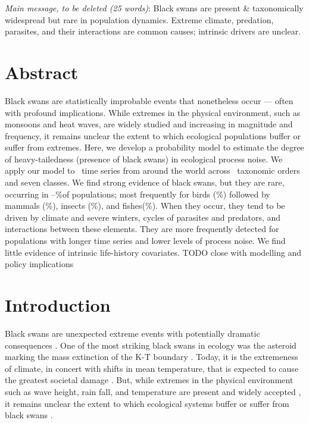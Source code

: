 
\noindent
\emph{Main message, to be deleted (25 words)}: Black swans are present \&
taxonomically widespread but rare in population dynamics. Extreme climate,
predation, parasites, and their interactions are common causes; intrinsic
drivers are unclear.

\section{Abstract}

Black swans are statistically improbable events that nonetheless occur ---
often with profound implications. While extremes in the physical
environment, such as monsoons and heat waves, are widely studied and increasing
in magnitude and frequency, it remains unclear the extent to which ecological
populations buffer or suffer from extremes. Here, we develop a probability
model to estimate the degree of heavy-tailedness (presence of black swans) in
ecological process noise. We apply our model to \NPops~time series from around
the world across \NOrders~taxonomic orders and seven classes. We find strong
evidence of black swans, but they are rare, occurring in
\overallMinPerc--\overallMaxPerc\%of populations; most frequently for birds
(\AvesRangePerc\%) followed by mammals (\MammaliaRangePerc\%), insects
(\InsectaRangePerc\%), and fishes(\OsteichthyesRangePerc\%). When they occur,
they tend to be driven by climate and severe winters, cycles of parasites and
predators, and interactions between these elements. They are more frequently
detected for populations with longer time series and lower levels of process
noise. We find little evidence of intrinsic life-history covariates. TODO close
with modelling and policy implications

\section{Introduction}

Black swans are unexpected extreme events with potentially dramatic
consequences \citep{taleb2007,sornette2009}. One of the most striking black
swans in ecology was the asteroid marking the mass extinction of the K-T
boundary \citep{harnik2012}. Today, it is the extremeness of climate, in
concert with shifts in mean temperature, that is expected to cause the greatest
societal damage \citep{ipcc2012}. But, while extremes in the physical
environment such as wave height, rain fall, and temperature are present and
widely accepted \citep{gaines1993,katz2005}, it remains unclear the extent to
which ecological systems buffer or suffer from black swans \citep{nunez2012}.

